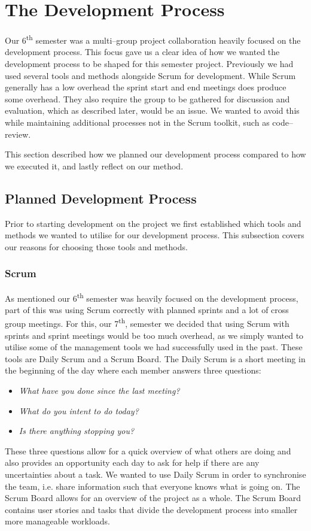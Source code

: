 \section{The Development Process}
Our 6\textsuperscript{th} semester was a multi--group project collaboration heavily focused on the development process.
This focus gave us a clear idea of how we wanted the development process to be shaped for this semester project.
Previously we had used several tools and methods alongside Scrum for development.
While Scrum generally has a low overhead the sprint start and end meetings does produce some overhead. 
They also require the group to be gathered for discussion and evaluation, which as described later, would be an issue.
We wanted to avoid this while maintaining additional processes not in the Scrum toolkit, such as code--review.

This section described how we planned our development process compared to how we executed it, and lastly reflect on our method.
\subsection{Planned Development Process}
Prior to starting development on the project we first established which tools and methods we wanted to utilise for our development process.
This subsection covers our reasons for choosing those tools and methods.
\subsubsection{Scrum}
As mentioned our 6\textsuperscript{th} semester was heavily focused on the development process, part of this was using Scrum correctly with planned sprints and a lot of cross group meetings.
For this, our 7\textsuperscript{th}, semester we decided that using Scrum with sprints and sprint meetings would be too much overhead, as we simply wanted to utilise some of the management tools we had successfully used in the past.
These tools are Daily Scrum and a Scrum Board.
The Daily Scrum is a short meeting in the beginning of the day where each member answers three questions:
\begin{itemize}
    \item \textit{What have you done since the last meeting?}
    \item \textit{What do you intent to do today?}
    \item \textit{Is there anything stopping you?}
\end{itemize}
These three questions allow for a quick overview of what others are doing and also provides an opportunity each day to ask for help if there are any uncertainties about a task.
We wanted to use Daily Scrum in order to synchronise the team, i.e. share information such that everyone knows what is going on.
The Scrum Board allows for an overview of the project as a whole.
The Scrum Board contains user stories and tasks that divide the development process into smaller more manageable workloads.
